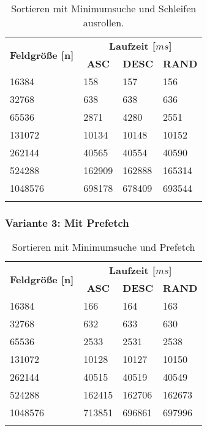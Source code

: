 \begin{center}
	\begin{longtable}{|p{5cm}|p{3cm}|p{3cm}|p{3cm}|}
		\hline
		
		\multirow{2}{5cm}{\centering \textbf{Feldgröße [n]}} & \multicolumn{3}{|c|}{ \textbf{Laufzeit [$ms$]}} \\\cline{2-4}
		& \multicolumn{1}{|c|}{\textbf{ASC}} & \multicolumn{1}{|c|}{\textbf{DESC}} &\multicolumn{1}{|c|}{\textbf{RAND}} \\
		\hhline{|=|=|=|=|}
		
		16384 & 158 & 157 & 156\\
		\hline
		32768 & 638 & 638 & 636\\
		\hline
		65536 & 2871 & 4280 & 2551\\
		\hline
		131072 & 10134 & 10148 & 10152\\
		\hline
		262144 & 40565 & 40554 & 40590\\
		\hline
		524288 & 162909 & 162888 & 165314\\
		\hline
		1048576 & 698178 & 678409 & 693544\\
		\hline
		
		\caption{Sortieren mit Minimumsuche und Schleifen ausrollen.}
		\label{tab:selectionsort-v2}
	\end{longtable}
\end{center}

\subsubsection{Variante 3: Mit Prefetch}

\begin{center}
	\begin{longtable}{|p{5cm}|p{3cm}|p{3cm}|p{3cm}|}
		\hline
		
		\multirow{2}{5cm}{\centering \textbf{Feldgröße [n]}} & \multicolumn{3}{|c|}{ \textbf{Laufzeit [$ms$]}} \\\cline{2-4}
		& \multicolumn{1}{|c|}{\textbf{ASC}} & \multicolumn{1}{|c|}{\textbf{DESC}} &\multicolumn{1}{|c|}{\textbf{RAND}} \\
		\hhline{|=|=|=|=|}
		
		16384 & 166 & 164 & 163\\
		\hline
		32768 & 632 & 633 & 630\\
		\hline
		65536 & 2533 & 2531 & 2538\\
		\hline
		131072 & 10128 & 10127 & 10150\\
		\hline
		262144 & 40515 & 40519 & 40549\\
		\hline
		524288 & 162415 & 162706 & 162673\\
		\hline
		1048576 & 713851 & 696861 & 697996\\
		\hline
		
		\caption{Sortieren mit Minimumsuche und Prefetch}
		\label{tab:selectionsort-v3}
	\end{longtable}
\end{center}

